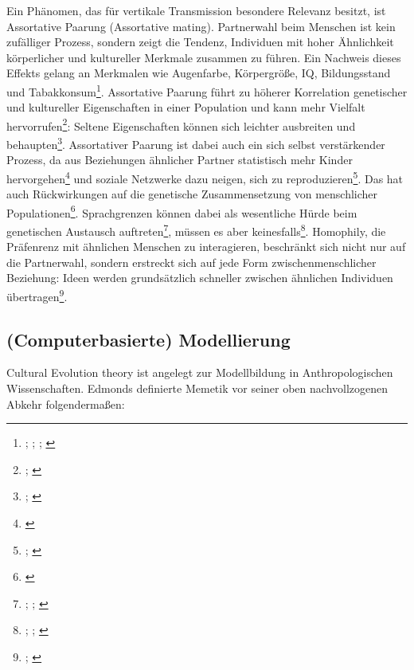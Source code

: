 \documentclass[openany,twoside,twocolumn]{book}
\let\rmarkdownfootnote\footnote%
\def\footnote{\protect\rmarkdownfootnote}
\begin{document}
Ein Phänomen, das für vertikale Transmission besondere Relevanz besitzt,
ist Assortative Paarung (Assortative mating). Partnerwahl beim Menschen
ist kein zufälliger Prozess, sondern zeigt die Tendenz, Individuen mit
hoher Ähnlichkeit körperlicher und kultureller Merkmale zusammen zu
führen. Ein Nachweis dieses Effekts gelang an Merkmalen wie Augenfarbe,
Körpergröße, IQ, Bildungsstand und Tabakkonsum\footnote{\textcite{domingue_genetic_2014};
  \textcite{keller_genetic_2013}; \textcite{laeng_why_2007};
  \textcite{treur_spousal_2015}}. Assortative Paarung führt zu höherer
Korrelation genetischer und kultureller Eigenschaften in einer
Population und kann mehr Vielfalt hervorrufen\footnote{\textcite{feldman_evolution_1977};
  \textcite{rice_multifactorial_1978}}: Seltene Eigenschaften können
sich leichter ausbreiten und behaupten\footnote{\textcite{creanza_complexity_2014};
  \textcite{creanza_models_2012}}. Assortativer Paarung ist dabei auch
ein sich selbst verstärkender Prozess, da aus Beziehungen ähnlicher
Partner statistisch mehr Kinder hervorgehen\footnote{\textcite{thiessen_human_1980}}
und soziale Netzwerke dazu neigen, sich zu reproduzieren\footnote{\textcite{abdellaoui_association_2013};
  \textcite{abdellaoui_educational_2015}}. Das hat auch Rückwirkungen
auf die genetische Zusammensetzung von menschlicher
Populationen\footnote{\textcite{robinson_genetic_2017}}. Sprachgrenzen
können dabei als wesentliche Hürde beim genetischen Austausch
auftreten\footnote{\textcite{barbujani_zones_1990};
  \textcite{de_filippo_y-chromosomal_2011};
  \textcite{karafet_coevolution_2016}}, müssen es aber
keinesfalls\footnote{\textcite{hunley_gene_2005};
  \textcite{hunley_genetic_2008}; \textcite{srithawong_genetic_2015}}.
Homophily, die Präfenrenz mit ähnlichen Menschen zu interagieren,
beschränkt sich nicht nur auf die Partnerwahl, sondern erstreckt sich
auf jede Form zwischenmenschlicher Beziehung: Ideen werden grundsätzlich
schneller zwischen ähnlichen Individuen übertragen\footnote{\textcite{centola_experimental_2011};
  \textcite{centola_spread_2010}}.

\hypertarget{computerbasierte-modellierung}{%
\subsection{(Computerbasierte)
Modellierung}\label{computerbasierte-modellierung}}

Cultural Evolution theory ist angelegt zur Modellbildung in
Anthropologischen Wissenschaften. Edmonds definierte Memetik vor seiner
oben nachvollzogenen Abkehr folgendermaßen:
\end{document}
